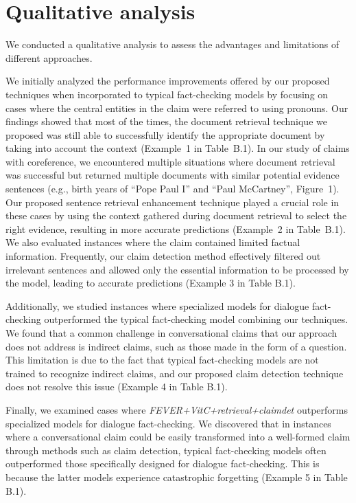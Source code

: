 \section{Qualitative analysis}
We conducted a qualitative analysis to assess the advantages and limitations of different approaches.

We initially analyzed the performance improvements offered by our proposed techniques when incorporated to typical fact-checking models by focusing on cases where the central entities in the claim were referred to using pronouns. Our findings showed that most of the times, the document retrieval technique we proposed was still able to successfully identify the appropriate document by taking into account the context (Example~1 in Table~B.1).
In our study of claims with coreference, we encountered multiple situations where document retrieval was successful but returned multiple documents with  similar 
potential evidence sentences (e.g., birth years of ``Pope Paul I'' and ``Paul McCartney'', Figure~1). Our proposed sentence retrieval enhancement technique played a crucial role in these cases by using the context gathered during document retrieval to select the right evidence, resulting in more accurate predictions (Example~2 in Table~B.1). We also evaluated instances where the claim contained limited factual information. Frequently, our claim detection method effectively filtered out irrelevant sentences and allowed only the essential information to be processed by the model, leading to accurate predictions (Example 3 in Table B.1).

Additionally, we studied instances where specialized models for dialogue fact-checking outperformed the typical fact-checking model combining our techniques. We found that a common challenge in conversational claims that our approach does not address is indirect claims, such as those made in the form of a question. This limitation is due to the fact that typical fact-checking models are not trained to recognize indirect claims, and our proposed claim detection technique does not resolve this issue (Example 4 in Table B.1).

Finally, we examined cases where \textit{FEVER+VitC+retrieval+claimdet} outperforms specialized models for dialogue fact-checking. We discovered that in instances where a conversational claim could be easily transformed into a well-formed claim through methods such as claim detection, typical fact-checking models often outperformed those specifically designed for dialogue fact-checking. This is because the latter models experience catastrophic forgetting (Example 5 in Table B.1).